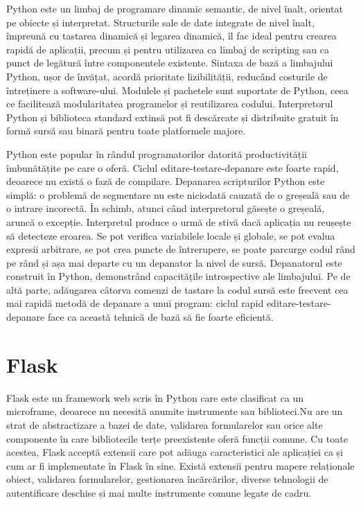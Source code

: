 \par Python este un limbaj de programare dinamic semantic, de nivel înalt, orientat pe obiecte și interpretat. Structurile sale de date integrate de nivel înalt, împreună cu tastarea dinamică și legarea dinamică, îl fac ideal pentru crearea rapidă de aplicații, precum și pentru utilizarea ca limbaj de scripting sau ca punct de legătură între componentele existente. Sintaxa de bază a limbajului Python, ușor de învățat, acordă prioritate lizibilității, reducând costurile de întreținere a software-ului. Modulele și pachetele sunt suportate de Python, ceea ce facilitează modularitatea programelor și reutilizarea codului. Interpretorul Python și biblioteca standard extinsă pot fi descărcate și distribuite gratuit în formă sursă sau binară pentru toate platformele majore.
\par Python este popular în rândul programatorilor datorită productivității îmbunătățite pe care o oferă. Ciclul editare-testare-depanare este foarte rapid, deoarece nu există o fază de compilare. Depanarea scripturilor Python este simplă: o problemă de segmentare nu este niciodată cauzată de o greșeală sau de o intrare incorectă. În schimb, atunci când interpretorul găsește o greșeală, aruncă o excepție. Interpretul produce o urmă de stivă dacă aplicația nu reușește să detecteze eroarea. Se pot verifica variabilele locale și globale, se pot evalua expresii arbitrare, se pot crea puncte de întrerupere, se poate parcurge codul rând pe rând și așa mai departe cu un depanator la nivel de sursă. Depanatorul este construit în Python, demonstrând capacitățile introspective ale limbajului. Pe de altă parte, adăugarea câtorva comenzi de tastare la codul sursă este frecvent cea mai rapidă metodă de depanare a unui program: ciclul rapid editare-testare-depanare face ca această tehnică de bază să fie foarte eficientă.

\section{Flask}
\label{sec:ch3sec5}

\par Flask este un framework web scris în Python care este clasificat ca un microframe, deoarece nu necesită anumite instrumente sau biblioteci.Nu are un strat de abstractizare a bazei de date, validarea formularelor sau orice alte componente în care bibliotecile terțe preexistente oferă funcții comune. Cu toate acestea, Flask acceptă extensii care pot adăuga caracteristici ale aplicației ca și cum ar fi implementate în Flask în sine. Există extensii pentru mapere relaționale obiect, validarea formularelor, gestionarea încărcărilor, diverse tehnologii de autentificare deschise și mai multe instrumente comune legate de cadru.